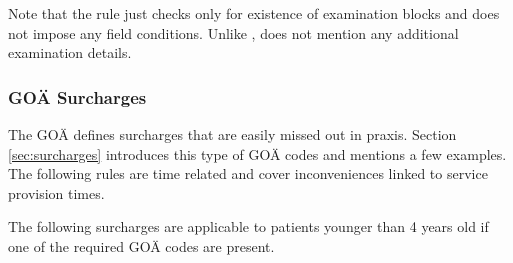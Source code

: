 Note that the rule just checks only for existence of examination blocks and does not impose any field conditions.
Unlike ,  does not mention any additional examination details.

\subsubsection{GOÄ Surcharges}

The GOÄ defines surcharges that are easily missed out in praxis.
Section \ref{sec:surcharges} introduces this type of GOÄ codes and mentions a few examples.
The following rules are time related and cover inconveniences linked to service provision times.









The following surcharges are applicable to patients younger than 4 years old if one of the required GOÄ codes are present.






